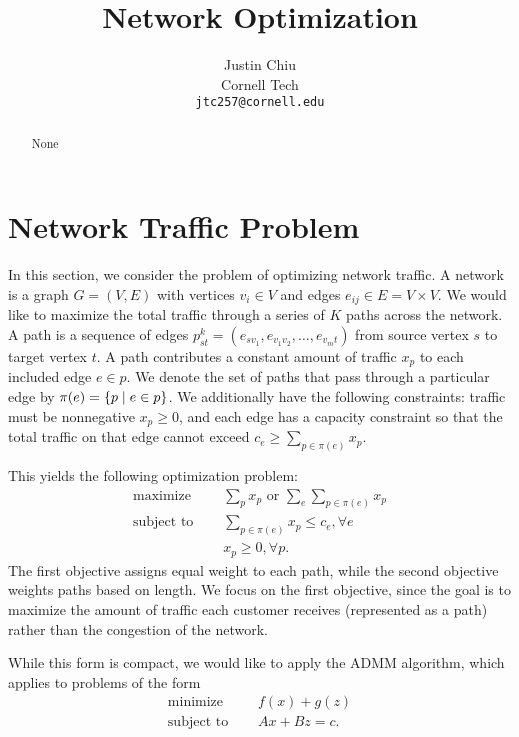 \documentclass[11pt]{article}
\title{Network Optimization}
\author{Justin Chiu \\
  Cornell Tech \\
  \texttt{jtc257@cornell.edu}}
\begin{document}
\maketitle
\begin{abstract}
None
\end{abstract}

\section{Network Traffic Problem}
In this section, we consider the problem of optimizing network traffic.
A network is a graph $G = (V,E)$ with vertices $v_i\in V$ and edges
$e_{ij}\in E = V\times V$.
We would like to maximize the total traffic through a series of $K$ paths across the network.
A path is a sequence of edges $p_{st}^k = (e_{sv_1},e_{v_1v_2},\ldots,e_{v_mt})$
from source vertex $s$ to target vertex $t$.
A path contributes a constant amount of traffic $x_p$ to each included edge $e\in p$.
We denote the set of paths that pass through a particular edge by
$\pi(e) = \left\{p \mid e \in p\right\}$.
We additionally have the following constraints: traffic must be nonnegative $x_p \geq 0$,
and each edge has a capacity constraint so that the total traffic on that
edge cannot exceed $ c_e \ge \sum_{p\in\pi(e)} x_p $.

This yields the following optimization problem:
\begin{equation}
\label{eqn:network-opt}
\begin{aligned}
\textrm{maximize } \quad & \sum_{p} x_p \textrm{ or } \sum_{e} \sum_{p\in\pi(e)}x_{p}\\
\textrm{subject to } \quad &\sum_{p\in\pi(e)}x_p \le c_e, \forall e\\
& x_p \geq 0, \forall p.
\end{aligned}
\end{equation}
The first objective assigns equal weight to each path, while the second
objective weights paths based on length.
We focus on the first objective, since the goal is to maximize the amount of traffic
each customer receives (represented as a path) rather than the congestion
of the network.

While this form is compact, we would like to apply the ADMM algorithm,
which applies to problems of the form
\begin{equation}
\label{eqn:admm}
\begin{aligned}
\textrm{minimize } \quad & f(x) + g(z)\\
\textrm{subject to } \quad & Ax + Bz = c.
\end{aligned}
\end{equation}
\end{document}
